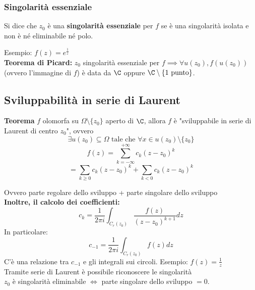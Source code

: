 \subsubsection{Singolarità essenziale}
\begin{tcolorbox}
	Si dice che $z_0$ è una \textbf{singolarità essenziale} per $f$ se è una singolarità isolata e non è né eliminabile né polo.
\end{tcolorbox}
Esempio: $f(z)=e^{\frac{1}{z}}$
\\\textbf{Teorema di Picard: }$z_0$ singolarità essenziale per $f\implies \forall u(z_0),f(u(z_0))$ (ovvero l'immagine di $f$) è data da $\C$ oppure $\C\setminus \{1 \text{ punto}\}$.
\subsection{Sviluppabilità in serie di Laurent}
\begin{tcolorbox}
	\textbf{Teorema} $f$ olomorfa su $\Omega\setminus \{z_0\} $ aperto di $\C$, allora $f$ è "sviluppabile in serie di Laurent di centro $z_0$", ovvero
	\[\exists u(z_0)\subseteq  \Omega \text{ tale che }\forall x\in u(z_0)\setminus \{z_0\} \]
	\[f(z)=\sum_{k=-\infty}^{+\infty} c_k(z-z_0)^k\]
	\[=\sum_{k\ge 0}^{} c_k(z-z_0)^k+\sum_{k<0}^{} c_k(z-z_0)^k\]
\end{tcolorbox}
Ovvero parte regolare dello sviluppo + parte singolare dello sviluppo
\\\textbf{Inoltre, il calcolo dei coefficienti:} 
\[c_k=\frac{1}{2\pi i}\int_{C_r(z_0)}^{} \frac{f(z)}{(z-z_0)^{k+1}}dz\] 
In particolare:
\[c_{-1}=\frac{1}{2\pi i}\int_{C_r(z_0)}^{} f(z)dz\]
C'è una relazione tra $c_{-1}$ e gli integrali sui circoli.
Esempio: $f(z)=\frac{1}{z}$
\\Tramite serie di Laurent è possibile riconoscere le singolarità
\\$z_0$ è singolarità eliminabile $\iff$ parte singolare dello sviluppo $=0$.



